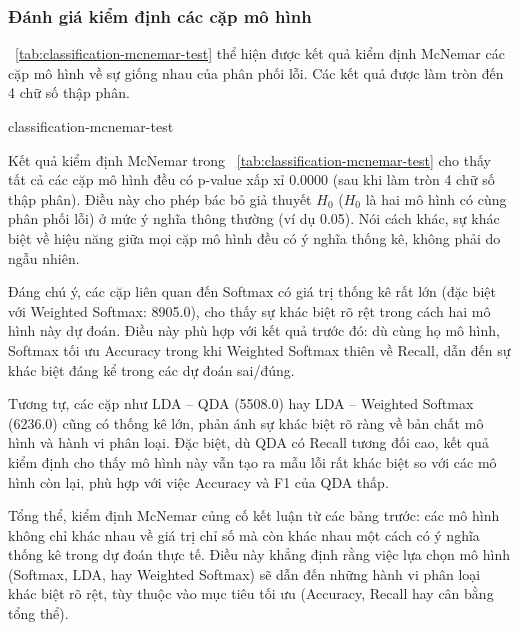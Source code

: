 \subsubsection{Đánh giá kiểm định các cặp mô hình}

\tablename~\ref{tab:classification-mcnemar-test} thể hiện được kết quả kiểm
định McNemar các cặp mô hình về sự giống nhau của phân phối lỗi. Các kết quả
được làm tròn đến 4 chữ số thập phân.

\begin{table}[htbp]
  \centering
  \caption{Kết quả kiểm định McNemar các cặp mô hình trên tập kiểm tra}
  \label{tab:classification-mcnemar-test}
  {classification-mcnemar-test}
\end{table}

Kết quả kiểm định McNemar trong
\tablename~\ref{tab:classification-mcnemar-test} cho thấy tất cả các cặp mô
hình đều có p-value xấp xỉ  0.0000 (sau khi làm tròn 4 chữ số thập phân). Điều
này cho phép bác bỏ giả thuyết $H_0$ ($H_0$ là  hai mô hình có cùng phân phối
lỗi) ở mức ý nghĩa thông thường (ví dụ 0.05). Nói cách khác, sự khác biệt về
hiệu năng giữa mọi cặp mô hình đều có ý nghĩa thống kê, không phải do ngẫu
nhiên.

Đáng chú ý, các cặp liên quan đến Softmax có giá trị thống kê rất lớn (đặc biệt
với Weighted Softmax: 8905.0), cho thấy sự khác biệt rõ rệt trong cách hai mô
hình này dự đoán. Điều này phù hợp với kết quả trước đó: dù cùng họ mô hình,
Softmax tối ưu Accuracy trong khi Weighted Softmax thiên về Recall, dẫn đến sự
khác biệt đáng kể trong các dự đoán sai/đúng.

Tương tự, các cặp như LDA – QDA (5508.0) hay LDA – Weighted Softmax (6236.0)
cũng có thống kê lớn, phản ánh sự khác biệt rõ ràng về bản chất mô hình và hành
vi phân loại. Đặc biệt, dù QDA có Recall tương đối cao, kết quả kiểm định cho
thấy mô hình này vẫn tạo ra mẫu lỗi rất khác biệt so với các mô hình còn lại,
phù hợp với việc Accuracy và F1 của QDA thấp.

Tổng thể, kiểm định McNemar củng cố kết luận từ các bảng trước: các mô hình
không chỉ khác nhau về giá trị chỉ số mà còn khác nhau một cách có ý nghĩa
thống kê trong dự đoán thực tế. Điều này khẳng định rằng việc lựa chọn mô hình
(Softmax, LDA, hay Weighted Softmax) sẽ dẫn đến những hành vi phân loại khác
biệt rõ rệt, tùy thuộc vào mục tiêu tối ưu (Accuracy, Recall hay cân bằng tổng
thể).
